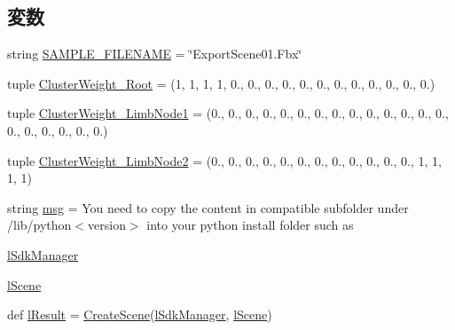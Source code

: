 \subsection*{変数}
\begin{DoxyCompactItemize}
\item 
string \hyperlink{namespace_export_scene01_a35f2fb508264feceb4698b1a056f1299}{S\+A\+M\+P\+L\+E\+\_\+\+F\+I\+L\+E\+N\+A\+ME} = \char`\"{}Export\+Scene01.\+Fbx\char`\"{}
\item 
tuple \hyperlink{namespace_export_scene01_ace880e46ae13bae1d002bdbb92645e38}{Cluster\+Weight\+\_\+\+Root} = (1, 1, 1, 1, 0., 0., 0., 0., 0., 0., 0., 0., 0., 0., 0., 0.)
\item 
tuple \hyperlink{namespace_export_scene01_aece84d413185a9c148721f54cb1f81cf}{Cluster\+Weight\+\_\+\+Limb\+Node1} = (0., 0., 0., 0., 0., 0., 0., 0., 0., 0., 0., 0., 0., 0., 0., 0., 0., 0., 0., 0.)
\item 
tuple \hyperlink{namespace_export_scene01_a76894ede5c9ca5232d3b966c48feb57d}{Cluster\+Weight\+\_\+\+Limb\+Node2} = (0., 0., 0., 0., 0., 0., 0., 0., 0., 0., 0., 0., 1, 1, 1, 1)
\item 
string \hyperlink{namespace_export_scene01_aef87bccc17058b2c211c63680798418f}{msg} = \textquotesingle{}You need to copy the content in compatible subfolder under /lib/python$<$version$>$ into your python install folder such as \textquotesingle{}
\item 
\hyperlink{namespace_export_scene01_a274501fa77b1532f3c541c81214795ff}{l\+Sdk\+Manager}
\item 
\hyperlink{namespace_export_scene01_a934dd78165a29a5a918a21076fe99be7}{l\+Scene}
\item 
def \hyperlink{namespace_export_scene01_ac81cce52596c82919f3896aae18aaf4e}{l\+Result} = \hyperlink{namespace_export_scene01_a405c93947107b07b27cb80d3c4712ef1}{Create\+Scene}(\hyperlink{namespace_export_scene01_a274501fa77b1532f3c541c81214795ff}{l\+Sdk\+Manager}, \hyperlink{namespace_export_scene01_a934dd78165a29a5a918a21076fe99be7}{l\+Scene})
\end{DoxyCompactItemize}


